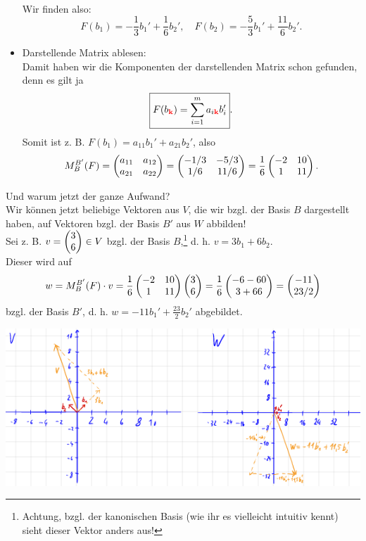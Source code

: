 \begin{Beispiel}
\begin{itemize}
\begin{align*}
    \end{align*}
    Wir finden also:
    \begin{equation*}
        F(b_1)=-\frac{1}{3}b_1'+\frac{1}{6}b_2',\quad F(b_2)=-\frac{5}{3}b_1'+\frac{11}{6}b_2'.
    \end{equation*}
    \item Darstellende Matrix ablesen:\\
    Damit haben wir die Komponenten der darstellenden Matrix schon gefunden, denn es gilt ja 
\begin{equation*}
    \boxed{F(b_{\textcolor{red}{\textbf{k}}})=\sum_{i=1}^ma_{i\textcolor{red}{\textbf{k}}}b'_i}.
\end{equation*}
    Somit ist z. B. $F(b_1)=a_{11} b_1'+a_{21}b_2'$, also
    \begin{equation*}
        M_B^{B'}(F)=\begin{pmatrix}a_{11}&a_{12}\\a_{21}&a_{22}\end{pmatrix}=\begin{pmatrix}-1/3&-5/3\\1/6&11/6\end{pmatrix}=\frac{1}{6}\begin{pmatrix}-2&10\\1&11\end{pmatrix}.
    \end{equation*}
\end{itemize}
Und warum jetzt der ganze Aufwand?\\
Wir können jetzt beliebige Vektoren aus $V$, die wir bzgl. der Basis $B$ dargestellt haben, auf Vektoren bzgl. der Basis $B'$ aus $W$ abbilden!\\
Sei z. B. $v=\begin{pmatrix}3\\6\end{pmatrix}\in V$ bzgl. der Basis $B$,\footnote{Achtung, bzgl. der kanonischen Basis (wie ihr es vielleicht intuitiv kennt) sieht dieser Vektor anders aus!} d. h. $v=3b_1+6b_2$.\\
Dieser wird auf
\begin{equation*}
    w=M_B^{B'}(F)\cdot v=\frac{1}{6}\begin{pmatrix}-2&10\\1&11\end{pmatrix}\begin{pmatrix}3\\6\end{pmatrix}=\frac{1}{6}\begin{pmatrix}-6-60\\3+66\end{pmatrix}=\begin{pmatrix}-11\\23/2\end{pmatrix}
\end{equation*}
bzgl. der Basis $B'$, d. h. $w=-11b_1'+\frac{23}{2}b_2'$ abgebildet.
\begin{center}
    \includegraphics[width=.7\textwidth]{Dateien/00/12BeispielEbeneLinAbbB.PNG}

\end{center}
\end{Beispiel}
